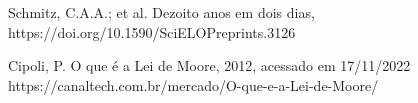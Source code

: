 \documentclass[
12pt,		%
openright,	%
twoside,  %
a4paper,			%
chapter=TITLE,		%
english,			%
french,				%
spanish,			%
brazil				%
]{USPSC-classe/USPSC}
\begin{document}
\begin{flushleft}
\begin{flushleft}
\begin{flushleft}
\begin{flushleft}
\begin{flushleft}
\begin{flushleft}
\begin{flushleft}
\begin{flushleft}
[Schmitz et al., 2021] Schmitz, C.A.A.; et al. Dezoito anos em dois dias, https://doi.org/10.1590/SciELOPreprints.3126
\end{flushleft}


\end{flushleft}


\end{flushleft}


\end{flushleft}


\end{flushleft}


\end{flushleft}


\end{flushleft}


\end{flushleft}


\begin{flushleft}
\begin{flushleft}
\begin{flushleft}
\begin{flushleft}
\begin{flushleft}
\begin{flushleft}
\begin{flushleft}
\begin{flushleft}
[CIPOLI, 2012] Cipoli, P. O que \'e a Lei de Moore, 2012, acessado em 17/11/2022 https://canaltech.com.br/mercado/O-que-e-a-Lei-de-Moore/
\end{flushleft}


\end{flushleft}


\end{flushleft}


\end{flushleft}


\end{flushleft}


\end{flushleft}


\end{flushleft}


\end{flushleft}
\end{document}
